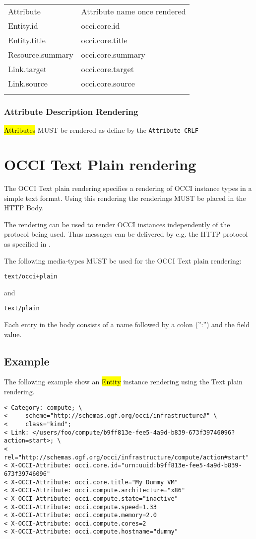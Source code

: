 \documentclass[10pt,a4paper]{article}
\begin{document}
 {
	\begin{tabular}{ll}
		\toprule
			Attribute & Attribute name once rendered \\
		\colrule
			Entity.id & occi.core.id \\
			Entity.title & occi.core.title \\
			Resource.summary & occi.core.summary \\
			Link.target & occi.core.target \\
			Link.source & occi.core.source \\
		\botrule
	\end{tabular}
}

\subsubsection{Attribute Description Rendering}
\label{sec:format_attribute_description}

\hl{Attributes} MUST be rendered as define by the {\tt Attribute CRLF}

\section{OCCI Text Plain rendering}
\label{sec:text}
The OCCI Text plain rendering specifies a rendering of OCCI instance types in a simple text format. Using this rendering the renderings MUST be placed in the HTTP Body.

The rendering can be used to render OCCI instances independently of the
protocol being used. Thus messages can be delivered by e.g. the HTTP
protocol as specified in \cite{occi:protocol}.

The following media-types MUST be used for the OCCI Text plain rendering:

	{\tt text/occi+plain}

and

	{\tt text/plain}

Each entry in the body consists of a name followed by a colon (”:”) and the field value.

\subsection{Example}

The following example show an \hl{Entity} instance rendering using the Text plain rendering.

\begin{verbatim}
< Category: compute; \
<     scheme="http://schemas.ogf.org/occi/infrastructure#" \
<     class="kind";
< Link: </users/foo/compute/b9ff813e-fee5-4a9d-b839-673f39746096?action=start>; \
<     rel="http://schemas.ogf.org/occi/infrastructure/compute/action#start"
< X-OCCI-Attribute: occi.core.id="urn:uuid:b9ff813e-fee5-4a9d-b839-673f39746096"
< X-OCCI-Attribute: occi.core.title="My Dummy VM"
< X-OCCI-Attribute: occi.compute.architecture="x86"
< X-OCCI-Attribute: occi.compute.state="inactive"
< X-OCCI-Attribute: occi.compute.speed=1.33
< X-OCCI-Attribute: occi.compute.memory=2.0
< X-OCCI-Attribute: occi.compute.cores=2
< X-OCCI-Attribute: occi.compute.hostname="dummy"
\end{verbatim}
\end{document}
